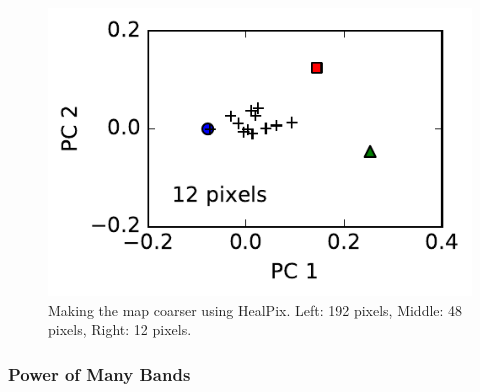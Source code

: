 \documentclass[iop,numberedappendix,apj]{emulateapj}
\def\memoYF#1{\color{red}[YF: {\bf #1}]\color{black}}
\begin{document}
\begin{figure}[tbh!]
\begin{minipage}{0.33\hsize}
\begin{center}
\includegraphics[width=\hsize]{IGBP_PCplane_Nside0.pdf}
    \end{center}
     \end{minipage}
    \caption{Making the map coarser using HealPix. Left: 192 pixels, Middle: 48 pixels, Right: 12 pixels. }
\label{fig:lowresolution}
\end{figure}


\subsubsection{Power of Many Bands}

\end{document}
